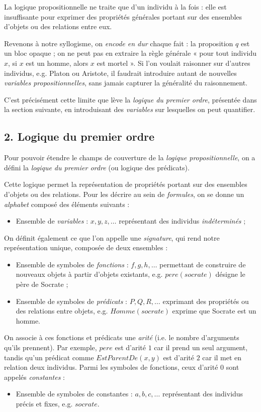 \documentclass[11pt]{article}
\begin{document}
La logique propositionnelle ne traite que d'un individu à la fois : elle est insuffisante pour exprimer des propriétés générales portant sur des ensembles d'objets ou des relations entre eux.

Revenons à notre syllogisme, on \emph{encode en dur} chaque fait : la proposition $q$ est un bloc opaque ; on ne peut pas en extraire la règle générale « pour tout individu $x$, si $x$ est un homme, alors $x$ est mortel ». Si l'on voulait raisonner sur d'autres individus, e.g. Platon ou Aristote, il faudrait introduire autant de nouvelles \textit{variables propositionnelles}, sans jamais capturer la généralité du raisonnement.

C'est précisément cette limite que lève la \textit{logique du premier ordre}, présentée dans la section suivante, en introduisant des \textit{variables} sur lesquelles on peut quantifier.

\subsection*{2. Logique du premier ordre}
\label{lpo}
\vspace{0.4cm}

Pour pouvoir étendre le champs de couverture de la \textit{logique propositionnelle}, on a défini la \textit{logique du premier ordre} (ou logique des prédicats).

Cette logique permet la représentation de propriétés portant sur des ensembles d'objets ou des relations. Pour les décrire au sein de \textit{formules}, on se donne un \textit{alphabet} composé des éléments suivants :
\begin{itemize}
    \item Ensemble de \textit{variables} : $x, y, z, \ldots$ représentant des individus \textit{indéterminés} ;
\end{itemize}
On définit également ce que l'on appelle une \textit{signature}, qui rend notre représentation
unique, composée de deux ensembles :
\begin{itemize}
    \item Ensemble de symboles de \textit{fonctions} : $f, g, h, \ldots$ permettant de construire de nouveaux objets à partir d'objets existants, e.g. $\mathit{pere}(\mathit{socrate})$ désigne le père de Socrate ;
    \item Ensemble de symboles de \textit{prédicats} : $P, Q, R, \ldots$ exprimant des propriétés ou des relations entre objets, e.g. $\mathit{Homme}(\mathit{socrate})$ exprime que Socrate est un homme.
\end{itemize}
On associe à ces fonctions et prédicats une \textit{arité} (i.e. le nombre d'arguments qu'ils prennent). Par exemple, $\mathit{pere}$ est d'arité $1$ car il prend un seul argument, tandis qu'un prédicat comme $\mathit{EstParentDe}(x, y)$ est d'arité $2$ car il met en relation deux individus. Parmi les symboles de fonctions, ceux d'arité $0$ sont appelés
\textit{constantes} :
\begin{itemize}
    \item Ensemble de symboles de constantes : $a, b, c, \ldots$ représentant des individus précis et fixes, e.g. $\mathit{socrate}$.
\end{itemize}
\end{document}

